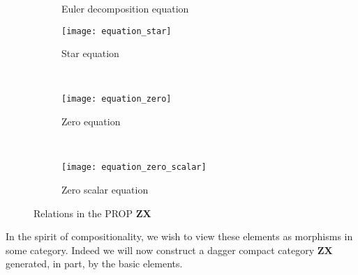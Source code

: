 \documentclass[11pt]{amsart}
\newcommand{\cat}[1]{\mathbf{#1}}
\theoremstyle{remark}
\theoremstyle{definition}
\begin{document}
\begin{figure}[h]
{\begin{minipage}{\textwidth}
\begin{subfigure}[t]{0.5\textwidth}
				\caption{Euler decomposition equation}
			\end{subfigure}%
			\vspace{2ex}
			\begin{subfigure}[t]{0.3\textwidth}
				\centering
				\texttt{[image: equation\_star]}
				\caption{Star equation}
			\end{subfigure}%
			~
			\begin{subfigure}[t]{0.3\textwidth}
				\centering
				\texttt{[image: equation\_zero]}
				\caption{Zero equation}
			\end{subfigure}%
			~
			\begin{subfigure}[t]{0.3\textwidth}
				\centering
				\texttt{[image: equation\_zero\_scalar]}
				\caption{Zero scalar equation}
			\end{subfigure}%
		\end{minipage}
	}
	\caption{Relations in the PROP $\cat{ZX}$}
	\label{fig:ZX equations}
\end{figure}
In the spirit of compositionality, we wish to view these elements as morphisms in some category. Indeed we will now construct a dagger compact category $\cat{ZX}$ generated, in part, by the basic elements.  
\end{document}
